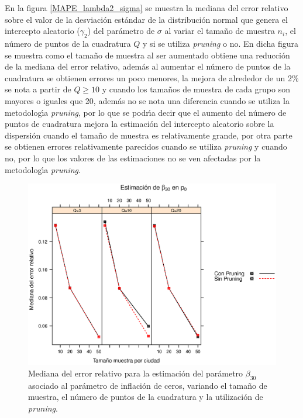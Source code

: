 En la figura \ref{MAPE_lambda2_sigma} se muestra la mediana del error relativo sobre el valor de la desviaci\'{o}n est\'{a}ndar de la distribuci\'{o}n normal que genera el intercepto aleatorio ($\gamma_2$) del par\'{a}metro de $\sigma$ al variar el tama\~{n}o de muestra $n_i$, el n\'{u}mero de puntos de la cuadratura $Q$ y si se utiliza \textit{pruning} o no. En dicha figura se muestra como el tama\~{n}o de muestra al ser aumentado obtiene una reducci\'{o}n de la mediana del error relativo, adem\'{a}s al aumentar el n\'{u}mero de puntos de la cuadratura se obtienen errores un poco menores, la mejora de alrededor de un 2\% se nota a partir de $Q\geq10$ y cuando los tama\~{n}os de muestra de cada grupo son mayores o iguales que 20, adem\'{a}s no se nota una diferencia cuando se utiliza la metodolog\'{\i}a \textit{pruning}, por lo que se podr\'{\i}a decir que el aumento del n\'{u}mero de puntos de cuadratura mejora la estimaci\'{o}n del intercepto aleatorio sobre la dispersi\'{o}n cuando el tama\~{n}o de muestra es relativamente grande, por otra parte se obtienen errores relativamente parecidos cuando se utiliza \textit{pruning} y cuando no, por lo que los valores de las estimaciones no se ven afectadas por la metodolog\'{\i}a \textit{pruning}.\\


\begin{figure}
	\begin{center}
		\includegraphics[scale=0.6]{MAPE_beta0_p0.eps}	
		\caption{Mediana del error relativo para la estimaci\'{o}n del par\'{a}metro $\beta_{30}$ asociado al par\'{a}metro de inflaci\'{o}n de ceros, variando el tama\~{n}o de muestra, el n\'{u}mero de puntos de la cuadratura y la utilizaci\'{o}n de \textit{pruning}.}
		\label{MAPE_beta0_p0}
	\end{center}
\end{figure}

